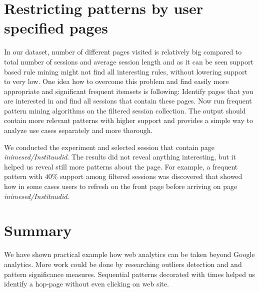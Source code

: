 \documentclass[english,a4paper]{article}
\begin{document}
\section{Restricting patterns by user specified pages}

In our dataset, number of different pages visited is relatively big compared to total number of sessions and average session length and as it can be seen support based rule mining might not find all interesting rules, without lowering support to very low. One idea how to overcome this problem and find easily more appropriate and significant frequent itemsets is following: Identify pages that you are interested in and find all sessions that contain these pages. Now run frequent pattern mining algorithms on the filtered session collection. The output should contain more relevant patterns with higher support and provides a simple way to analyze use cases separately and more thorough.

We conducted the experiment and selected session that contain page \emph{inimesed/Instituudid}. The results did not reveal anything interesting, but it helped us reveal still more patterns about the page. For example, a   frequent pattern with $40\%$ support among filtered sessions was discovered that showed how in some cases users to refresh on the front page before arriving on page \emph{inimesed/Instituudid}.

\section{Summary}
We have shown practical example how web analytics can be taken beyond Google analytics.
More work could be done by researching  outliers detection and and pattern significance measures.
Sequential patterns decorated with times helped us identify a hop-page without even clicking on web site.











\end{document}
